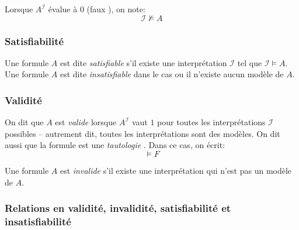 Lorsque $A^{\mathcal{I}}$ évalue à $0$ (\og faux \fg), on note:
\[
\mathcal{I} \not\vDash A
\]

\subsubsection{Satisfiabilité}

Une formule $A$ est dite \og \textit{satisfiable} \fg{} s'il existe une interprétation $\mathcal{I}$ tel que $\mathcal{I} \vDash A$.
Une formule $A$ est dite \og \textit{insatisfiable} \fg{} dans le cas ou il n'existe aucun modèle de $A$. 

\subsubsection{Validité}

On dit que $A$ est \og \textit{valide} \fg{} lorsque $A^{\mathcal{I}}$ vaut $1$ pour toutes les interprétations $\mathcal{I}$ possibles – autrement dit, toutes les interprétations sont des modèles.
On dit aussi que la formule est une \og \textit{tautologie} \fg{}.
Dans ce cas, on écrit:
\[
\vDash F
\]

Une formule $A$ est \og \textit{invalide} \fg{} s'il existe une interprétation qui n'est pas un modèle de $A$.

\subsubsection{Relations en validité, invalidité, satisfiabilité et insatisfiabilité}

